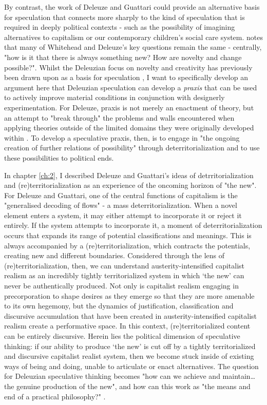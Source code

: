 By contrast, the work of Deleuze and Guattari could provide an alternative basis for speculation that connects more sharply to the kind of speculation that is required in deeply political contexts - such as the possibility of imagining alternatives to capitalism or our contemporary children's social care system. \citet[p. 23]{shaviro_deleuzes_2007} notes that many of Whitehead and Deleuze's key questions remain the same - centrally, "how is it that there is always something new? How are novelty and change possible?". Whilst the Deleuzian focus on novelty and creativity has previously been drawn upon as a basis for speculation \citep{savransky_developing_2017}, I want to specifically develop an argument here that Deleuzian speculation can develop a \textit{praxis} that can be used to actively improve material conditions in conjunction with designerly experimentation. For Deleuze, praxis is not merely an enactment of theory, but an attempt to "break through" the problems and walls encountered when applying theories outside of the limited domains they were originally developed within \citep[p. 206]{deleuze_desert_2004}. To develop a speculative praxis, then, is to engage in "the ongoing creation of further relations of possibility" through deterritorialization \citep[p. 365]{harrison_future_2020} and to use these possibilities to political ends.

In chapter \ref{ch:2}, I described Deleuze and Guattari's ideas of detrritorialization and (re)territorialization as an experience of the oncoming horizon of "the new". For Deleuze and Guattari, one of the central functions of capitalism is the "generalised decoding of flows" \citep[p. 153]{deleuze_anti-oedipus:_1983} - a mass deterritorialization. When a novel element enters a system, it may either attempt to incorporate it or reject it entirely. If the system attempts to incorporate it, a moment of deterritorialization occurs that expands its range of potential classifications and meanings. This is always accompanied by a (re)territorialization, which contracts the potentials, creating new and different boundaries. Considered through the lens of (re)territorialization, then, we can understand austerity-intensified capitalist realism as an incredibly tightly territorialized system in which ‘the new’ can never be authentically produced. Not only is capitalist realism engaging in precorporation to shape desires as they emerge so that they are more amenable to its own hegemony, but the dynamics of justification, classification and discursive accumulation that have been created in austerity-intensified capitalist realism create a performative space. In this context, (re)territorialized content can be entirely discursive. Herein lies the political dimension of speculative thinking: if our ability to produce ‘the new’ is cut off by a tightly territorialized and discursive capitalist realist system, then we become stuck inside of existing ways of being and doing, unable to articulate or enact alternatives. The question for Deleuzian speculative thinking becomes "how can we achieve and maintain… the genuine production of the new", and how can this work as "the means and end of a practical philosophy?" \citep[p. 2]{osullivan_deleuze_2008}. 

